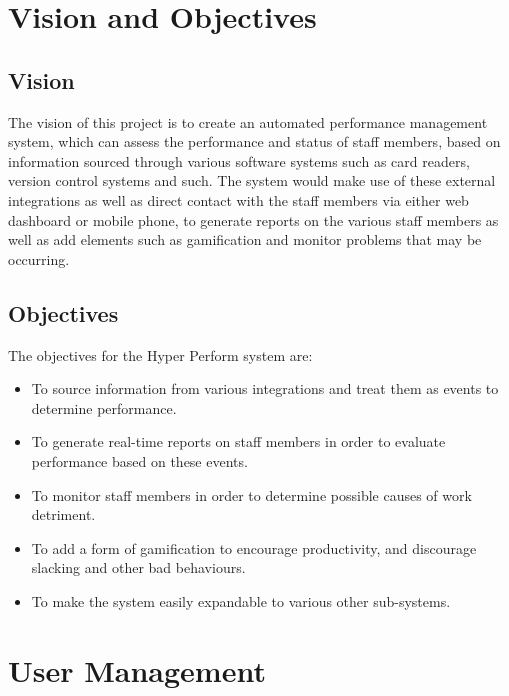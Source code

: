 \documentclass[11pt,a4paper]{article}
\begin{document}
\section{Vision and Objectives}
\subsection{Vision}
The vision of this project is to create an automated performance management system, which can assess the performance and status of staff members, based on information sourced through various software systems such as card readers, version control systems and such. The system would make use of these external integrations as well as direct contact with the staff members via either web dashboard or mobile phone, to generate reports on the various staff members as well as add elements such as gamification and monitor problems that may be occurring.

\subsection{Objectives}
The objectives for the Hyper Perform system are:
\begin{itemize}
	\item To source information from various integrations and treat them as events to determine performance.
	\item To generate real-time reports on staff members in order to evaluate performance based on these events.
	\item To monitor staff members in order to determine possible causes of work detriment.
	\item To add a form of gamification to encourage productivity, and discourage slacking and other bad behaviours.
	\item To make the system easily expandable to various other sub-systems.
\end{itemize}



\section{User Management}
\end{document}
